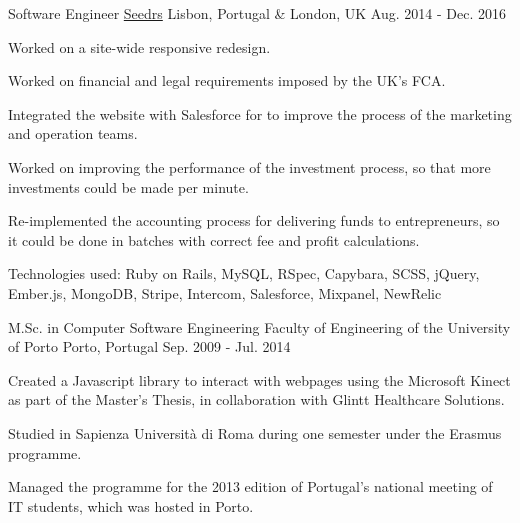 \documentclass[11pt, a4paper]{awesome-cv}
\begin{document}
\begin{cventries}
  \cventry
    {Software Engineer} %
    {\href{https://www.seedrs.com/}{Seedrs}} %
    {Lisbon, Portugal \& London, UK} %
    {Aug. 2014 - Dec. 2016} %
    {
      \begin{cvitems} %
        \item {Worked on a site-wide responsive redesign.}
        \item {Worked on financial and legal requirements imposed by the UK’s FCA.}
        \item {Integrated the website with Salesforce for to improve the process of the marketing and operation teams.}
        \item {Worked on improving the performance of the investment process, so that more investments could be made per minute.}
        \item {Re-implemented the accounting process for delivering funds to entrepreneurs, so it could be done in batches with correct fee and profit calculations.}
        \item {Technologies used: Ruby on Rails, MySQL, RSpec, Capybara, SCSS, jQuery, Ember.js, MongoDB, Stripe, Intercom, Salesforce, Mixpanel, NewRelic}
      \end{cvitems}
    }

\end{cventries}



\begin{cventries}

  \cventry
    {M.Sc. in Computer Software Engineering} %
    {Faculty of Engineering of the University of Porto} %
    {Porto, Portugal} %
    {Sep. 2009 - Jul. 2014} %
    {
      \begin{cvitems} %
        \item {Created a Javascript library to interact with webpages using the Microsoft Kinect as part of the Master's Thesis, in collaboration with Glintt Healthcare Solutions.}
        \item {Studied in Sapienza Università di Roma during one semester under the Erasmus programme.}
        \item {Managed the programme for the 2013 edition of Portugal's national meeting of IT students, which was hosted in Porto.}
      \end{cvitems}
    }

\end{cventries}


\end{document}
